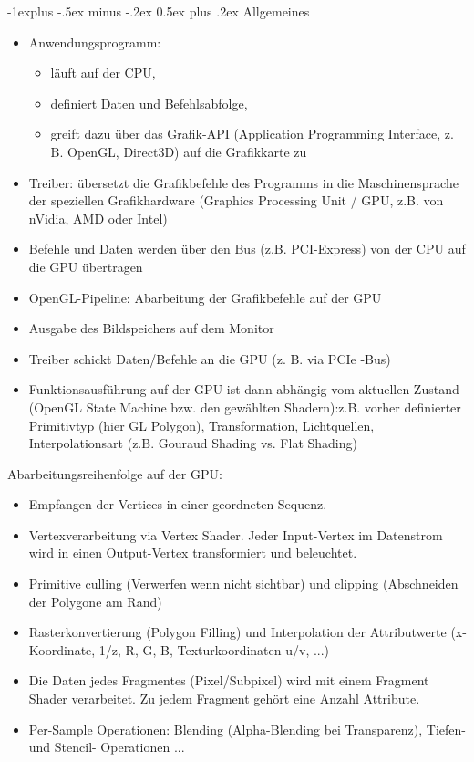 \documentclass[10pt,landscape]{article}
\makeatletter
\renewcommand{\subsection}{\@startsection{subsection}{2}{0mm}%
                                {-1explus -.5ex minus -.2ex}%
                                {0.5ex plus .2ex}%
                                {\normalfont\normalsize\bfseries}}
\makeatother
\begin{document}
\begin{multicols}{3}
\subsection{Allgemeines}
\begin{itemize}
  \item Anwendungsprogramm:
        \begin{itemize}
          \item läuft auf der CPU,
          \item definiert Daten und Befehlsabfolge,
          \item greift dazu über das Grafik-API (Application Programming Interface, z. B. OpenGL, Direct3D) auf die Grafikkarte zu
        \end{itemize}
  \item Treiber: übersetzt die Grafikbefehle des Programms in die Maschinensprache der speziellen Grafikhardware (Graphics Processing Unit / GPU, z.B. von nVidia, AMD oder Intel)
  \item Befehle und Daten werden über den Bus (z.B. PCI-Express) von der CPU auf die GPU übertragen
  \item OpenGL-Pipeline: Abarbeitung der Grafikbefehle auf der GPU
  \item Ausgabe des Bildspeichers auf dem Monitor
  \item Treiber schickt Daten/Befehle an die GPU (z. B. via PCIe -Bus)
  \item Funktionsausführung auf der GPU ist dann abhängig vom aktuellen Zustand (OpenGL State Machine bzw. den gewählten Shadern):z.B. vorher definierter Primitivtyp (hier GL Polygon), Transformation, Lichtquellen, Interpolationsart (z.B. Gouraud Shading vs. Flat Shading)
\end{itemize}

Abarbeitungsreihenfolge auf der GPU:
\begin{itemize}
  \item Empfangen der Vertices in einer geordneten Sequenz.
  \item Vertexverarbeitung via Vertex Shader. Jeder Input-Vertex im Datenstrom wird in einen Output-Vertex transformiert und beleuchtet.
  \item Primitive culling (Verwerfen wenn nicht sichtbar) und clipping (Abschneiden der Polygone am Rand)
  \item Rasterkonvertierung (Polygon Filling) und Interpolation der Attributwerte (x-Koordinate, 1/z, R, G, B, Texturkoordinaten u/v, ...)
  \item Die Daten jedes Fragmentes (Pixel/Subpixel) wird mit einem Fragment Shader verarbeitet. Zu jedem Fragment gehört eine Anzahl Attribute.
  \item Per-Sample Operationen: Blending (Alpha-Blending bei Transparenz), Tiefen- und Stencil- Operationen ...
\end{itemize}



\end{multicols}
\end{document}

